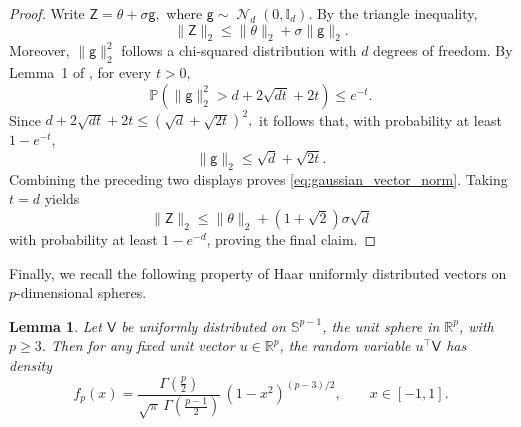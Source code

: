 \documentclass[10pt]{article}
\newtheorem{lemma}{Lemma}
\newcommand{\Id}{\mathbb I}
\DeclareMathOperator{\dnorm}{\mathcal N}
\begin{document}
\begin{proof}
Write $\mathsf Z=\theta+\sigma \mathsf g,$ where $\mathsf g\sim\dnorm_d(0,\Id_d)$. By the triangle inequality, 
\[ 
\|\mathsf Z\|_2 \le \|\theta\|_2+\sigma\|\mathsf g\|_2. 
\]
Moreover, $\|\mathsf g\|_2^2$ follows a chi-squared distribution with $d$ degrees of freedom. By Lemma~1 of \citet{laurent2000adaptive}, for every $t>0$, 
\[ 
\mathbb P\left( \|\mathsf g\|_2^2 > d+2\sqrt{dt}+2t \right) \le e^{-t}. 
\]
Since $d+2\sqrt{dt}+2t \le \left(\sqrt d+\sqrt{2t}\right)^2,$ it follows that, with probability at least $1-e^{-t}$, 
\[ 
\|\mathsf g\|_2 \le \sqrt d+\sqrt{2t}. 
\] 
Combining the preceding two displays proves \eqref{eq:gaussian_vector_norm}. Taking $t=d$ yields 
\[ 
\|\mathsf Z\|_2 \le \|\theta\|_2+(1+\sqrt 2)\sigma\sqrt d 
\] 
with probability at least $1-e^{-d}$, proving the final claim.
\end{proof}

Finally, we recall the following property of Haar uniformly distributed vectors on $p$-dimensional spheres.

\begin{lemma}
\label{lem:haar_coordinate_density}
Let $\mathsf{V}$ be uniformly distributed on $\mathbb S^{p-1}$, the unit sphere in $\mathbb{R}^p$, with $p \geq 3$. Then for any fixed unit vector $u \in \mathbb{R}^p$, the random variable $u^\top \mathsf{V}$ has density
\begin{equation}
\label{eq:haar_density}
    f_p(x) = \frac{\Gamma\!\left(\frac{p}{2}\right)}{\sqrt{\pi}\,\Gamma\!\left(\frac{p-1}{2}\right)}\,(1-x^2)^{(p-3)/2}, \qquad x \in [-1,1].
\end{equation}
\end{lemma}
\end{document}
